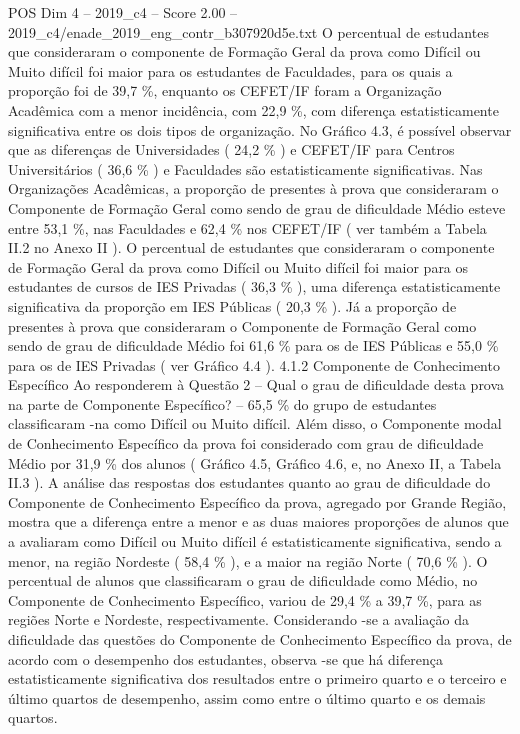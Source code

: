 \begin{textsample}{POS Dim 4 – 2019\_c4 – Score 2.00 – 2019\_c4/enade\_2019\_eng\_contr\_b307920d5e.txt}
O percentual de estudantes que consideraram o componente de Formação Geral da prova como Difícil ou Muito difícil foi maior para os estudantes de Faculdades, para os quais a proporção foi de 39,7 \%, enquanto os CEFET/IF foram a Organização Acadêmica com a menor incidência, com 22,9 \%, com diferença estatisticamente significativa entre os dois tipos de organização.
No Gráfico 4.3, é possível observar que as diferenças de Universidades ( 24,2 \% ) e CEFET/IF para Centros Universitários ( 36,6 \% ) e Faculdades são estatisticamente significativas.
Nas Organizações Acadêmicas, a proporção de presentes à prova que consideraram o Componente de Formação Geral como sendo de grau de dificuldade Médio esteve entre 53,1 \%, nas Faculdades e 62,4 \% nos CEFET/IF ( ver também a Tabela II.2 no Anexo II ).
O percentual de estudantes que consideraram o componente de Formação Geral da prova como Difícil ou Muito difícil foi maior para os estudantes de cursos de IES Privadas ( 36,3 \% ), uma diferença estatisticamente significativa da proporção em IES Públicas ( 20,3 \% ).
Já a proporção de presentes à prova que consideraram o Componente de Formação Geral como sendo de grau de dificuldade Médio foi 61,6 \% para os de IES Públicas e 55,0 \% para os de IES Privadas ( ver Gráfico 4.4 ). 4.1.2 Componente de Conhecimento Específico Ao responderem à Questão 2 – Qual o grau de dificuldade desta prova na parte de Componente Específico? – 65,5 \% do grupo de estudantes classificaram -na como Difícil ou Muito difícil.
Além disso, o Componente modal de Conhecimento Específico da prova foi considerado com grau de dificuldade Médio por 31,9 \% dos alunos ( Gráfico 4.5, Gráfico 4.6, e, no Anexo II, a Tabela II.3 ).
A análise das respostas dos estudantes quanto ao grau de dificuldade do Componente de Conhecimento Específico da prova, agregado por Grande Região, mostra que a diferença entre a menor e as duas maiores proporções de alunos que a avaliaram como Difícil ou Muito difícil é estatisticamente significativa, sendo a menor, na região Nordeste ( 58,4 \% ), e a maior na região Norte ( 70,6 \% ).
O percentual de alunos que classificaram o grau de dificuldade como Médio, no Componente de Conhecimento Específico, variou de 29,4 \% a 39,7 \%, para as regiões Norte e Nordeste, respectivamente.
Considerando -se a avaliação da dificuldade das questões do Componente de Conhecimento Específico da prova, de acordo com o desempenho dos estudantes, observa -se que há diferença estatisticamente significativa dos resultados entre o primeiro quarto e o terceiro e último quartos de desempenho, assim como entre o último quarto e os demais quartos.

\end{textsample}
